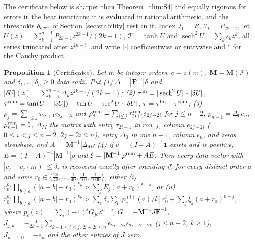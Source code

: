 \documentclass[pdflatex,sn-mathphys-num]{sn-jnl}
\newcommand{\cI}{\mathcal{I}}
\theoremstyle{thmstyleone}%
\newtheorem{proposition}{Proposition}[section]%
\theoremstyle{thmstylethree}%
\providecommand{\cI}{\mathcal{I}}
\begin{document}
The certificate below is sharper than Theorem~\ref{thm:S4} and equally rigorous for errors in the heat invariants; it is evaluated in rational arithmetic, and the thresholds $\delta_{\rm cert}$ of Section~\ref{sec:stability} rest on it. Index $\cI_0=R$, $\cI_k=P_{2k-1}$, let $U(z)=\sum_{k=1}^{n-1}P_{2k-1}z^{2k-1}/(2k-1)$, $\mathcal T=\tanh U$ and $\operatorname{sech}^2U=\sum_ks_kz^k$, all series truncated after $z^{2n-3}$, and write $|\cdot|$ coefficientwise or entrywise and $*$ for the Cauchy product.

\begin{proposition}[Certificates]\label{prop:S5}
Let $m$ be integer orders, $e=e(m)$, $\mathbf M=\mathbf M(\cI)$ and $\delta_1,\dots,\delta_n\ge0$ data radii. Put (1) $\Delta=|\mathbf F^{-1}|\delta$ and $|\delta U|(z)=\sum_{k=1}^{n-1}\Delta_kz^{2k-1}/(2k-1)$; (2) $\tau^{\rm lin}=|\operatorname{sech}^2U|*|\delta U|$, $\tau^{\rm rem}=\tan(U+|\delta U|)-\tan U-\sec^2U\cdot|\delta U|$, $\tau=\tau^{\rm lin}+\tau^{\rm rem}$; (3) $\rho_j=\sum_{i\le j}\tau_{2i+1}e_{2j-2i}$ and $\rho^{\rm rem}_j=\sum_{i\le j}\tau^{\rm rem}_{2i+1}e_{2j-2i}$ for $j\le n-2$, $\rho_{n-1}=\Delta_0e_n$, $\rho^{\rm rem}_{n-1}=0$, $\Delta_M$ the matrix with entry $\tau_{2i+1}$ in row $j$, column $e_{2j-2i}$ ($0\le i<j\le n-2$, $2j-2i\le n$), entry $\Delta_0$ in row $n-1$, column $e_n$, and zeros elsewhere, and $A=|\mathbf M^{-1}|\Delta_M$; (4) if $v=(I-A)^{-1}\mathbf 1$ exists and is positive, $E=(I-A)^{-1}|\mathbf M^{-1}|\rho$ and $\xi=|\mathbf M^{-1}|\rho^{\rm rem}+AE$. Then every data vector with $|\tilde c_j-c_j(m)|\le\delta_j$ is recovered exactly after rounding if, for every distinct order $a$ and some $r_0\in\{\frac{20}{40},\dots,\frac1{40},\frac1{100},\frac1{1000}\}$, either (i) $r_0^{k_a}\prod_{b\ne a}(|a-b|-r_0)^{k_b}>\sum_jE_j(a+r_0)^{n-j}$, or (ii) $r_0^{k_a}\prod_{b\ne a}(|a-b|-r_0)^{k_b}>\sum_c\delta_c\sum_l|p_c^{(l)}(a)/l!|\,r_0^l+\sum_j\xi_j(a+r_0)^{n-j}$, where $p_c(z)=\sum_j(-1)^jG_{jc}z^{n-j}$, $G=-\mathbf M^{-1}J\mathbf F^{-1}$, $J_{j,k}=-\frac1{2k-1}\sum_{k-1\le i\le j,\,2j-2i\le n}e_{2j-2i}s_{2i+2-2k}$ ($j\le n-2$, $k\ge1$), $J_{n-1,0}=-e_n$ and the other entries of $J$ zero.
\end{proposition}
\end{document}
